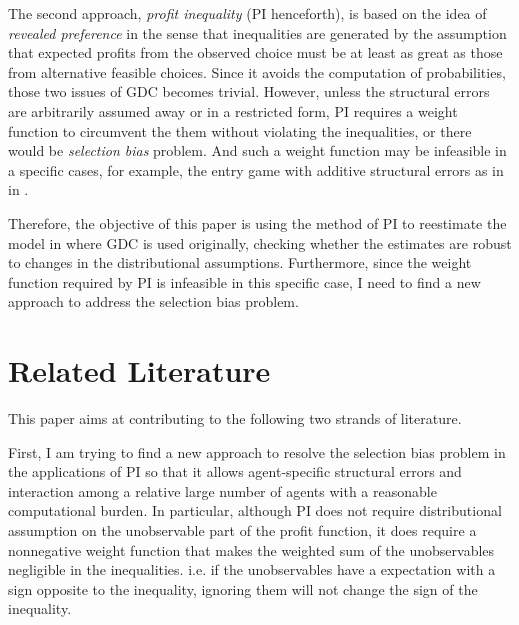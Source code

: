 \documentclass[draft]{article}
\begin{document}
The second approach, \textit{profit inequality} (PI henceforth), is based on the idea of \textit{revealed preference} in the sense that inequalities are generated by the assumption that expected profits from the observed choice must be at least as great as those from alternative feasible choices. Since it avoids the computation of probabilities, those two issues of GDC becomes trivial. However, unless the structural errors are arbitrarily assumed away or in a restricted form, PI requires a weight function to circumvent the them without violating the inequalities, or there would be \textit{selection bias} problem. And such a weight function may be infeasible in a specific cases,  for example, the entry game with additive structural errors as in in \cite{ciliberto2009market}.

Therefore, the objective of this paper is using the method of PI to reestimate the model in \cite{ciliberto2009market} where GDC is used originally, checking whether the estimates are robust to changes in the distributional assumptions. Furthermore, since the weight function required by PI is infeasible in this specific case, I need to find a new approach to address the selection bias problem.




\section{Related Literature}

This paper aims at contributing to the following two strands of literature.

First, I am trying to find a new approach to resolve the selection bias problem in the applications of PI so that it allows agent-specific structural errors and interaction among a relative large number of agents with a reasonable computational burden. In particular, although PI does not require distributional assumption on the unobservable part of the profit function, it does require a nonnegative weight function that makes the weighted sum of the unobservables negligible in the inequalities. i.e. if the unobservables have a expectation with a sign opposite to the inequality, ignoring them will not change the sign of the inequality. 
\end{document}
